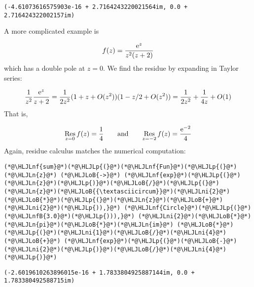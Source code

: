 \documentclass[12pt,a4paper]{article}
\newcommand{\HLJLn}[1]{#1}
\newcommand{\HLJLnf}[1]{\textcolor[RGB]{66,102,213}{#1}}
\newcommand{\HLJLnfB}[1]{\textcolor[RGB]{59,151,46}{#1}}
\newcommand{\HLJLni}[1]{\textcolor[RGB]{59,151,46}{#1}}
\newcommand{\HLJLoB}[1]{\textcolor[RGB]{102,102,102}{\textbf{#1}}}
\newcommand{\HLJLp}[1]{#1}
\def\qqand{\qquad\hbox{and}\qquad}
\def\E{ {\rm e} }
\def\Res_#1{\underset{#1}{\rm Res}\,}
\begin{document}
\begin{lstlisting}
(-4.61073616575903e-16 + 2.7164243220021564im, 0.0 + 2.716424322002157im)
\end{lstlisting}


A more complicated example is

\[
f(z) = {\E^z \over z^2 (z+2)}
\]
which has a double pole at $z = 0$. We find the residue by expanding in Taylor series:

\[
 {1 \over z^2} {\E^z \over z +2} = {1 \over  2 z^2} (1 + z + O(z^2)) (1 - z/2 + O(z^2)) =
        {1 \over 2 z^2} + {1 \over 4 z} + O(1)
\]
That is,

\[
\Res_{z=0} f(z) = {1 \over 4} \qqand \Res_{z=-2} f(z) = {\E^{-2} \over 4}
\]
Again, residue calculus matches the numerical computation:


\begin{lstlisting}
(*@\HLJLnf{sum}@*)(*@\HLJLp{(}@*)(*@\HLJLnf{Fun}@*)(*@\HLJLp{(}@*)(*@\HLJLn{z}@*) (*@\HLJLoB{->}@*) (*@\HLJLnf{exp}@*)(*@\HLJLp{(}@*)(*@\HLJLn{z}@*)(*@\HLJLp{)}@*)(*@\HLJLoB{/}@*)(*@\HLJLp{(}@*)(*@\HLJLn{z}@*)(*@\HLJLoB{{\textasciicircum}}@*)(*@\HLJLni{2}@*)(*@\HLJLoB{*}@*)(*@\HLJLp{(}@*)(*@\HLJLn{z}@*)(*@\HLJLoB{+}@*)(*@\HLJLni{2}@*)(*@\HLJLp{)),}@*) (*@\HLJLnf{Circle}@*)(*@\HLJLp{(}@*)(*@\HLJLnfB{3.0}@*)(*@\HLJLp{))),}@*) (*@\HLJLni{2}@*)(*@\HLJLoB{*}@*)(*@\HLJLn{pi}@*)(*@\HLJLoB{*}@*)(*@\HLJLn{im}@*) (*@\HLJLoB{*}@*) (*@\HLJLp{(}@*)(*@\HLJLni{1}@*)(*@\HLJLoB{/}@*)(*@\HLJLni{4}@*) (*@\HLJLoB{+}@*) (*@\HLJLnf{exp}@*)(*@\HLJLp{(}@*)(*@\HLJLoB{-}@*)(*@\HLJLni{2}@*)(*@\HLJLp{)}@*)(*@\HLJLoB{/}@*)(*@\HLJLni{4}@*)(*@\HLJLp{)}@*)
\end{lstlisting}

\begin{lstlisting}
(-2.6019610263896015e-16 + 1.7833804925887144im, 0.0 + 1.783380492588715im)
\end{lstlisting}
\end{document}
